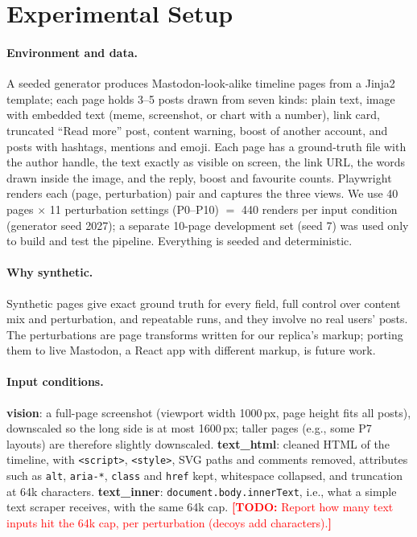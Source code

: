 \documentclass[letterpaper,10pt,twocolumn]{article}
\newcommand{\todo}[1]{\textcolor{red}{\textbf{[TODO:} #1\textbf{]}}}
\begin{document}
\section{Experimental Setup}\label{sec:setup}

\paragraph{Environment and data.}
A seeded generator produces Mastodon-look-alike timeline pages from a Jinja2
template; each page holds 3--5 posts drawn from seven kinds: plain text, image
with embedded text (meme, screenshot, or chart with a number), link card,
truncated ``Read more'' post, content warning, boost of another account, and
posts with hashtags, mentions and emoji. Each page has a ground-truth file with
the author handle, the text exactly as visible on screen, the link URL, the
words drawn inside the image, and the reply, boost and favourite counts.
Playwright renders each (page, perturbation) pair and captures the three views.
We use 40 pages $\times$ 11 perturbation settings (P0--P10) $=$ 440 renders per
input condition (generator seed 2027); a separate 10-page development set
(seed 7) was used only to build and test the pipeline. Everything is seeded and
deterministic.

\paragraph{Why synthetic.}
Synthetic pages give exact ground truth for every field, full control over
content mix and perturbation, and repeatable runs, and they involve no real
users' posts. The perturbations are page transforms written for our replica's
markup; porting them to live Mastodon, a React app with different markup, is
future work.

\paragraph{Input conditions.}
\textbf{vision}: a full-page screenshot (viewport width 1000\,px, page height
fits all posts), downscaled so the long side is at most 1600\,px; taller pages
(e.g., some P7 layouts) are therefore slightly downscaled.
\textbf{text\_html}: cleaned HTML of the timeline, with \texttt{<script>},
\texttt{<style>}, SVG paths and comments removed, attributes such as
\texttt{alt}, \texttt{aria-*}, \texttt{class} and \texttt{href} kept,
whitespace collapsed, and truncation at 64k characters.
\textbf{text\_inner}: \texttt{document.body.innerText}, i.e., what a simple text
scraper receives, with the same 64k cap. \todo{Report how many text inputs hit
the 64k cap, per perturbation (decoys add characters).}
\end{document}
